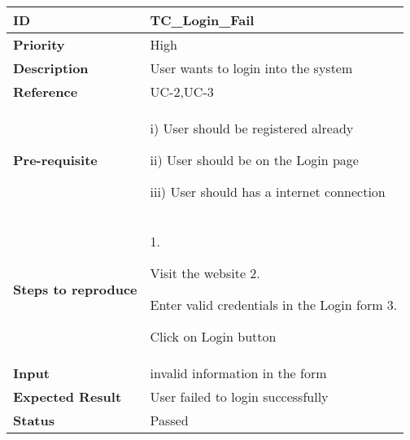 \begin{center}
    \begin{tabularx}{\textwidth}{|l|X|}
        \hline
        \textbf{ID}                 & TC\_Login\_Fail                      \\
        \hline
        \textbf{Priority}           & High                                 \\
        \hline
        \textbf{Description}        & User wants to login into the system  \\
        \hline
        \textbf{Reference}          & UC-2,UC-3                            \\
        \hline
        \textbf{Pre-requisite}      & i) User should be registered already

        ii) User should be on the Login page

        iii)  User should has a internet connection                        \\
        \hline
        \textbf{Steps to reproduce} & 1.

        Visit the website 2.

        Enter valid credentials in the Login form 3.

        Click on Login button                                              \\
        \hline
        \textbf{Input}              & invalid information in the form      \\
        \hline
        \textbf{Expected Result}    & User failed to login successfully    \\
        \hline
        \textbf{Status}             & Passed                               \\
        \hline
    \end{tabularx}
\end{center}
\newpage


